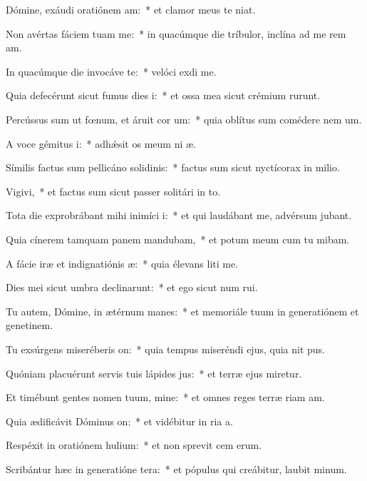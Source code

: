\item Dómine, exáudi oratiónem am:~* et clamor meus  te niat.
\item Non avértas fáciem tuam  me:~* in quacúmque die tríbulor, inclína ad me rem am.
\item In quacúmque die invocáve te:~* velóci exdi me.
\item Quia defecérunt sicut fumus dies i:~* et ossa mea sicut crémium rurunt.
\item Percússus sum ut fœnum, et áruit cor um:~* quia oblítus sum comédere nem um.
\item A voce gémitus i:~* adhǽsit os meum ni æ.
\item Símilis factus sum pellicáno solidinis:~* factus sum sicut nyctícorax in milio.
\item Vigivi,~* et factus sum sicut passer solitári in to.
\item Tota die exprobrábant mihi inimíci i:~* et qui laudábant me, advérsum  jubant.
\item Quia cínerem tamquam panem mandubam,~* et potum meum cum tu mibam.
\item A fácie iræ et indignatiónis æ:~* quia élevans liti me.
\item Dies mei sicut umbra declinarunt:~* et ego sicut num rui.
\item Tu autem, Dómine, in ætérnum manes:~* et memoriále tuum in generatiónem et genetinem.
\item Tu exsúrgens miseréberis on:~* quia tempus miseréndi ejus, quia nit pus.
\item Quóniam placuérunt servis tuis lápides jus:~* et terræ ejus miretur.
\item Et timébunt gentes nomen tuum, mine:~* et omnes reges terræ riam am.
\item Quia ædificávit Dóminus on:~* et vidébitur in ria a.
\item Respéxit in oratiónem hulium:~* et non sprevit cem erum.
\item Scribántur hæc in generatióne tera:~* et pópulus qui creábitur, laubit minum.
